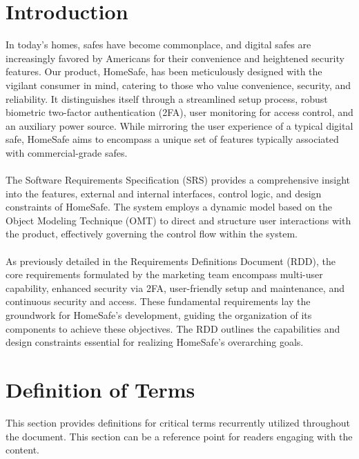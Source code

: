 \documentclass{article}
\begin{document}
\section{Introduction}
In today's homes, safes have become commonplace, and digital safes are increasingly favored by Americans for their convenience and heightened security features. Our product, HomeSafe, has been meticulously designed with the vigilant consumer in mind, catering to those who value convenience, security, and reliability. It distinguishes itself through a streamlined setup process, robust biometric two-factor authentication (2FA), user monitoring for access control, and an auxiliary power source. While mirroring the user experience of a typical digital safe, HomeSafe aims to encompass a unique set of features typically associated with commercial-grade safes. \\ \\
The Software Requirements Specification (SRS) provides a comprehensive insight into the features, external and internal interfaces, control logic, and design constraints of HomeSafe. The system employs a dynamic model based on the Object Modeling Technique (OMT) to direct and structure user interactions with the product, effectively governing the control flow within the system. \\ \\
As previously detailed in the Requirements Definitions Document (RDD), the core requirements formulated by the marketing team encompass multi-user capability, enhanced security via 2FA, user-friendly setup and maintenance, and continuous security and access. These fundamental requirements lay the groundwork for HomeSafe's development, guiding the organization of its components to achieve these objectives. The RDD outlines the capabilities and design constraints essential for realizing HomeSafe's overarching goals.

\section{Definition of Terms}
This section provides definitions for critical terms recurrently utilized throughout the document. This section can be a reference point for readers engaging with the content.
\end{document}
